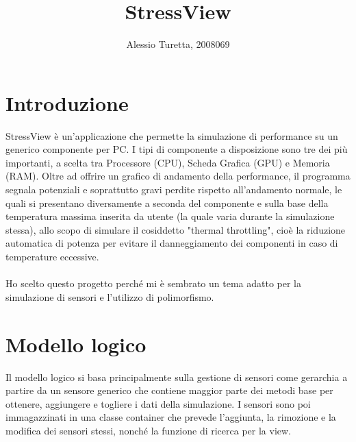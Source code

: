 \documentclass[10pt]{article}
\title{StressView}
\author{Alessio Turetta, 2008069}
\date{}
\begin{document}
\maketitle
\tableofcontents
\newpage

\section{Introduzione}
StressView è un'applicazione che permette la simulazione di
performance su un generico componente per PC.
I tipi di componente a disposizione sono tre dei più importanti, a scelta tra
Processore (CPU), Scheda Grafica (GPU) e Memoria (RAM).
Oltre ad offrire un grafico di andamento della performance, il programma segnala
potenziali e soprattutto gravi perdite rispetto all'andamento normale,
le quali si presentano diversamente a seconda del componente
e sulla base della temperatura massima inserita da utente (la quale varia
durante la simulazione stessa), allo scopo di simulare il cosiddetto "thermal
throttling", cioè la riduzione automatica di potenza per evitare il danneggiamento
dei componenti in caso di temperature eccessive.
\\\\
Ho scelto questo progetto perché mi è sembrato un tema adatto per la simulazione
di sensori e l'utilizzo di polimorfismo.

\section{Modello logico}
Il modello logico si basa principalmente sulla gestione di sensori come gerarchia
a partire da un sensore generico che contiene maggior parte dei metodi base
per ottenere, aggiungere e togliere i dati della simulazione.
I sensori sono poi immagazzinati in una classe container che prevede l'aggiunta,
la rimozione e la modifica dei sensori stessi, nonché la funzione di ricerca per la view.
\end{document}
